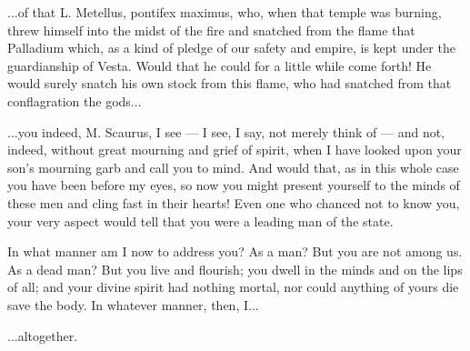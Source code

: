  ...of that L. Metellus, pontifex maximus, who, when that temple was burning, threw himself into the midst of the fire and snatched from the flame that Palladium which, as a kind of pledge of our safety and empire, is kept under the guardianship of Vesta. Would that he could for a little while come forth! He would surely snatch his own stock from this flame, who had snatched from that conflagration the gods...

 ...you indeed, M. Scaurus, I see --- I see, I say, not merely think of --- and not, indeed, without great mourning and grief of spirit, when I have looked upon your son's mourning garb and call you to mind. And would that, as in this whole case you have been before my eyes, so now you might present yourself to the minds of these men and cling fast in their hearts! Even one who chanced not to know you, your very aspect would tell that you were a leading man of the state.

 In what manner am I now to address you? As a man? But you are not among us. As a dead man? But you live and flourish; you dwell in the minds and on the lips of all; and your divine spirit had nothing mortal, nor could anything of yours die save the body. In whatever manner, then, I...

 ...altogether.
